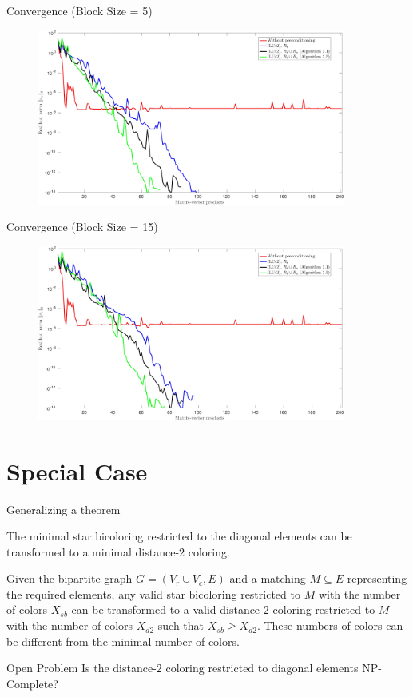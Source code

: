 \documentclass{beamer}
\begin{document}
\begin{frame}{Convergence (Block Size = 5)}
\begin{figure}
\centering
\includegraphics[width=0.9\textwidth]{jac_convergence_greedy_new_5}
\end{figure}
\end{frame}

\begin{frame}{Convergence (Block Size = 15)}
\begin{figure}
\centering
\includegraphics[width=0.9\textwidth]{jac_convergence_greedy_new_15}
\end{figure}
\end{frame}


\section{Special Case}
\begin{frame}{Generalizing a theorem}
\begin{theorem}
The minimal star bicoloring restricted to the diagonal elements
can be transformed to a minimal distance-$2$ coloring.
\end{theorem}
\pause\begin{theorem}
Given the bipartite graph $G=(V_r\cup V_c,E)$ and a matching $M\subseteq E$ representing
the required elements, any valid star bicoloring restricted to $M$
with the number of colors $X_{sb}$
can be transformed to a valid distance-$2$ coloring restricted to $M$
with the number of colors $X_{d2}$ such that $X_{sb} \geq X_{d2}$.
These numbers of colors can be different from the minimal number of colors.
\end{theorem}
\pause\begin{alertblock}{Open Problem}
Is the distance-$2$ coloring restricted to diagonal elements NP-Complete?
\end{alertblock}
\end{frame}
\end{document}
